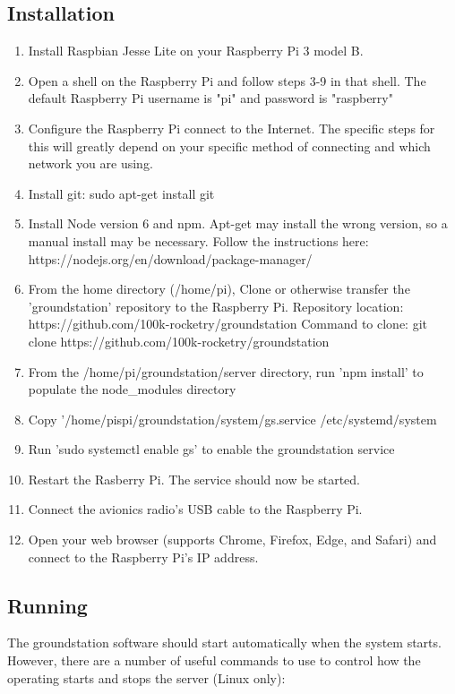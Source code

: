 \documentclass[10pt,draftclsnofoot,onecolumn]{IEEEtran}
\begin{document}
\subsection{Installation}
\begin{enumerate}

\item  Install Raspbian Jesse Lite on your Raspberry Pi 3 model B.
\item  Open a shell on the Raspberry Pi and follow steps 3-9 in that shell. The default Raspberry Pi
    username is "pi" and password is "raspberry"
\item  Configure the Raspberry Pi connect to the Internet. The specific steps for this will greatly
    depend on your specific method of connecting and which network you are using.
\item  Install git: sudo apt-get install git
\item  Install Node version 6 and npm. Apt-get may install the wrong version, so a manual install may be necessary.
    Follow the instructions here: https://nodejs.org/en/download/package-manager/
\item  From the home directory (/home/pi), Clone or otherwise transfer the 'groundstation'
    repository to the Raspberry Pi. Repository location: https://github.com/100k-rocketry/groundstation
    Command to clone: git clone https://github.com/100k-rocketry/groundstation
\item From the /home/pi/groundstation/server directory, run 'npm install' to populate the node\_modules directory
\item Copy '/home/pispi/groundstation/system/gs.service /etc/systemd/system
\item Run 'sudo systemctl enable gs' to enable the groundstation service
\item Restart the Rasberry Pi. The service should now be started.
\item Connect the avionics radio's USB cable to the Raspberry Pi.
\item Open your web browser (supports Chrome, Firefox, Edge, and Safari) and connect to the Raspberry
    Pi's IP address.
\end{enumerate}


\subsection{Running}
The groundstation software should start automatically when the system starts.
However, there are a number of useful commands to use to control how the operating
starts and stops the server (Linux only):
\end{document}
